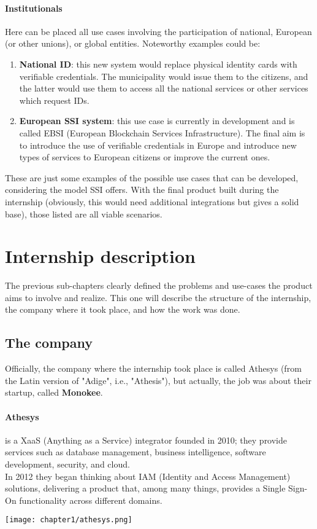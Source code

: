 \paragraph{Institutionals}
Here can be placed all use cases involving the participation of national, 
European (or other unions), or global entities.
Noteworthy examples could be:
\begin{enumerate}
    \item \textbf{National ID}: this new system would replace physical identity 
    cards with verifiable credentials. The municipality would issue them to the 
    citizens, and the latter would use them to access all the national services 
    or other services which request IDs.
    \item \textbf{European SSI system}: this use case is currently in development 
    and is called EBSI (European Blockchain Services Infrastructure). The final 
    aim is to introduce the use of verifiable credentials in Europe and introduce 
    new types of services to European citizens or improve the current ones.
\end{enumerate}
\vspace*{0.3cm}
These are just some examples of the possible use cases that can be developed, 
considering the model SSI offers.
With the final product built during the internship (obviously, this would need 
additional integrations but gives a solid base), those listed are all viable 
scenarios.
\section{Internship description}
The previous sub-chapters clearly defined the problems and use-cases the product 
aims to involve and realize. This one will describe the structure of the internship, 
the company where it took place, and how the work was done.
\subsection{The company}
Officially, the company where the internship took place is 
called Athesys (from the Latin version of "Adige", i.e., "Athesis"), but actually, 
the job was about their startup, called \textbf{Monokee}.
    \paragraph{Athesys} is a XaaS (Anything as a Service) integrator founded 
    in 2010; they provide     services such as database management, business 
    intelligence, software development, security, and cloud.\\
    In 2012 they began thinking about IAM (Identity and Access Management) solutions, 
    delivering a product that, among many things, provides a Single Sign-On 
    functionality across different domains.
    \begin{center}
        \texttt{[image: chapter1/athesys.png]}
    \end{center}
